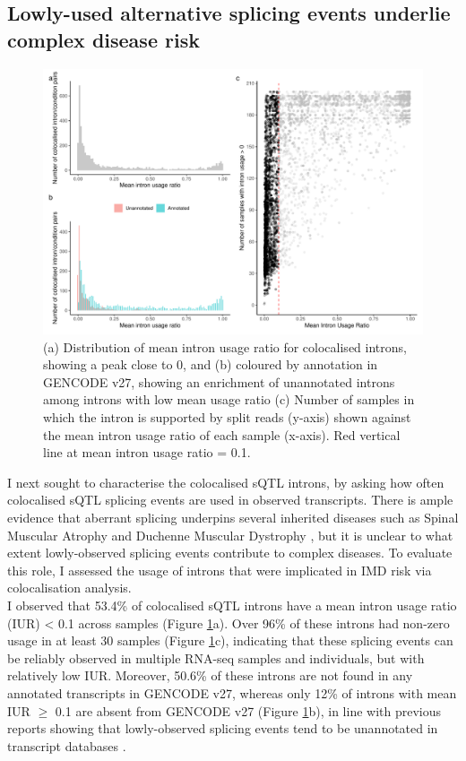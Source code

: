 \subsection{Lowly-used alternative splicing events underlie complex disease risk}
\begin{figure}[H]
  \centering
  \includegraphics[width=\textwidth]{low_sj}
  \caption[Intron usage of colocalised introns]{(a) Distribution of mean intron usage ratio for colocalised introns, showing a peak close to 0, and (b) coloured by annotation in GENCODE v27, showing an enrichment of unannotated introns among introns with low mean usage ratio (c) Number of samples in which the intron is supported by split reads (y-axis) shown against the mean intron usage ratio of each sample (x-axis). Red vertical line at mean intron usage ratio  = 0.1.}
  \label{fig:low_sj}   
\end{figure}
I next sought to characterise the colocalised sQTL introns, by asking how often colocalised sQTL splicing events are used in observed transcripts. There is ample evidence that aberrant splicing underpins several inherited diseases such as Spinal Muscular Atrophy and Duchenne Muscular Dystrophy \cite{Symoens2011-ew,Abramowicz2018-by,Sanz2017-re}, but it is unclear to what extent lowly-observed splicing events contribute to complex diseases. To evaluate this role, I assessed the usage of introns that were implicated in IMD risk via colocalisation analysis. \\

I observed that 53.4\% of colocalised sQTL introns have a mean intron usage ratio (IUR) < 0.1 across samples (Figure \ref{fig:low_sj}a). Over 96\% of these introns had non-zero usage in at least 30 samples (Figure \ref{fig:low_sj}c), indicating that these splicing events can be reliably observed in multiple RNA-seq samples and individuals, but with relatively low IUR. Moreover, 50.6\% of these introns are not found in any annotated transcripts in GENCODE v27, whereas only 12\% of introns with mean IUR $\geq$ 0.1 are absent from GENCODE v27 (Figure \ref{fig:low_sj}b), in line with previous reports showing that lowly-observed splicing events tend to be unannotated in transcript databases \cite{Nellore2016-fj,Pickrell2010-lz}. \\

